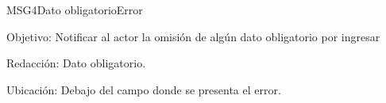 \begin{mensaje}{MSG4}{Dato obligatorio}{Error}
	\item [Objetivo:] Notificar al actor la omisión de algún dato obligatorio por ingresar
	\item[Redacción:] Dato obligatorio.
	\item [Ubicación:] Debajo del campo donde se presenta el error.
\end{mensaje}